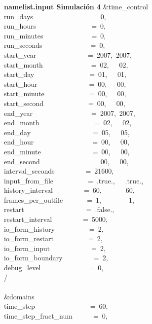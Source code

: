 
\textbf{namelist.input Simulación 4}
\&time\_control~~~~~~~~~~~~\\
run\_days~~~~~~~~~~~~~~~~~=~0,\\
run\_hours~~~~~~~~~~~~~~~~=~0,\\
run\_minutes~~~~~~~~~~~~~~=~0,\\
run\_seconds~~~~~~~~~~~~~~=~0,\\
start\_year~~~~~~~~~~~~~~~=~2007,~2007,~\\
start\_month~~~~~~~~~~~~~~=~02,~~~02,~~~\\
start\_day~~~~~~~~~~~~~~~~=~01,~~~01,~~~\\
start\_hour~~~~~~~~~~~~~~~=~00,~~~00,~~~\\
start\_minute~~~~~~~~~~~~~=~00,~~~00,~~~\\
start\_second~~~~~~~~~~~~~=~00,~~~00,~~~\\
end\_year~~~~~~~~~~~~~~~~~=~2007,~2007,~\\
end\_month~~~~~~~~~~~~~~~~=~02,~~~02,~~~\\
end\_day~~~~~~~~~~~~~~~~~~=~05,~~~05,~~~\\
end\_hour~~~~~~~~~~~~~~~~~=~00,~~~00,~~~\\
end\_minute~~~~~~~~~~~~~~~=~00,~~~00,~~~\\
end\_second~~~~~~~~~~~~~~~=~00,~~~00,~~~\\
interval\_seconds~~~~~~~~~=~21600,\\
input\_from\_file~~~~~~~~~~=~.true.,~~~.true.,~\\
history\_interval~~~~~~~~~=~60,~~~~~~~60,~~~~~\\
frames\_per\_outfile~~~~~~~=~1,~~~~~~~~1,~~~~~~\\
restart~~~~~~~~~~~~~~~~~~=~.false.,\\
restart\_interval~~~~~~~~~=~5000,\\
io\_form\_history~~~~~~~~~~=~2,\\
io\_form\_restart~~~~~~~~~~=~2,\\
io\_form\_input~~~~~~~~~~~~=~2,\\
io\_form\_boundary~~~~~~~~~=~2,\\
debug\_level~~~~~~~~~~~~~~=~0,\\
/\\
\\
\&domains~~~~~~~~~~~~~~~~~\\
time\_step~~~~~~~~~~~~~~~~=~60,\\
time\_step\_fract\_num~~~~~~=~0,\\
